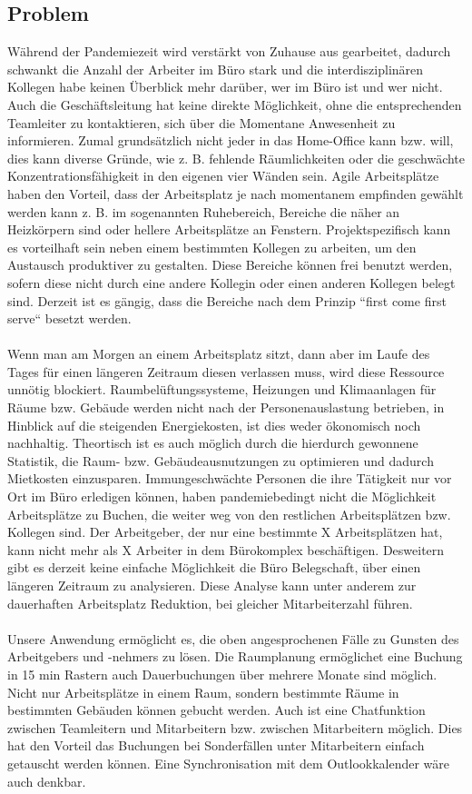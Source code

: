 \documentclass{article}
\begin{document}
\subsection{Problem}
Während der Pandemiezeit wird verstärkt von Zuhause aus gearbeitet, dadurch schwankt die Anzahl der Arbeiter im Büro
stark und die interdisziplinären Kollegen habe keinen Überblick mehr darüber, wer im Büro ist und wer nicht.
 Auch die Geschäftsleitung hat keine direkte Möglichkeit, ohne die entsprechenden Teamleiter zu kontaktieren, sich über 
die Momentane Anwesenheit zu informieren.
Zumal grundsätzlich nicht jeder in das Home-Office kann bzw. will, dies kann diverse Gründe, wie z. B. fehlende
Räumlichkeiten oder die geschwächte Konzentrationsfähigkeit in den eigenen vier Wänden sein. Agile Arbeitsplätze
haben den Vorteil, dass der Arbeitsplatz je nach momentanem empfinden gewählt werden kann z. B. im sogenannten Ruhebereich,
Bereiche die näher an Heizkörpern sind oder hellere Arbeitsplätze an Fenstern. Projektspezifisch kann es vorteilhaft sein
neben einem bestimmten Kollegen zu arbeiten, um den Austausch produktiver zu gestalten. Diese Bereiche können frei benutzt werden,
sofern diese nicht durch eine andere Kollegin oder einen anderen Kollegen belegt sind. Derzeit ist es gängig, dass die Bereiche nach
dem Prinzip “first come first serve“ besetzt werden.\\\\
Wenn man am Morgen an einem Arbeitsplatz sitzt, dann aber im Laufe des Tages für einen längeren Zeitraum diesen verlassen muss,
wird diese Ressource unnötig blockiert. Raumbelüftungssysteme, Heizungen und Klimaanlagen für Räume bzw. Gebäude werden nicht
nach der Personenauslastung betrieben, in Hinblick auf die steigenden Energiekosten, ist dies weder ökonomisch noch nachhaltig.
 Theortisch ist es auch möglich durch die hierdurch gewonnene Statistik, die Raum- bzw. Gebäudeausnutzungen zu optimieren
und dadurch Mietkosten einzusparen.
Immungeschwächte Personen die ihre Tätigkeit nur vor Ort im Büro erledigen können, haben pandemiebedingt nicht die Möglichkeit
Arbeitsplätze zu Buchen, die weiter weg von den restlichen Arbeitsplätzen bzw. Kollegen sind. Der Arbeitgeber, der nur eine bestimmte
X Arbeitsplätzen hat, kann nicht mehr als X Arbeiter in dem Bürokomplex beschäftigen. Desweitern gibt es derzeit keine einfache Möglichkeit
die Büro Belegschaft, über einen längeren Zeitraum zu analysieren. Diese Analyse kann unter anderem zur dauerhaften Arbeitsplatz Reduktion,
bei gleicher Mitarbeiterzahl führen.\\\\
Unsere Anwendung ermöglicht es, die oben angesprochenen Fälle zu Gunsten des Arbeitgebers und -nehmers zu lösen. 
Die Raumplanung ermöglichet eine Buchung in 15 min Rastern auch Dauerbuchungen über mehrere Monate sind möglich. 
Nicht nur Arbeitsplätze in einem Raum, sondern bestimmte Räume in bestimmten Gebäuden können gebucht werden. 
Auch ist eine Chatfunktion zwischen Teamleitern und Mitarbeitern bzw. zwischen Mitarbeitern möglich. 
Dies hat den Vorteil das Buchungen bei Sonderfällen unter Mitarbeitern einfach getauscht werden können. 
Eine Synchronisation mit dem Outlookkalender wäre auch denkbar.
\end{document}
